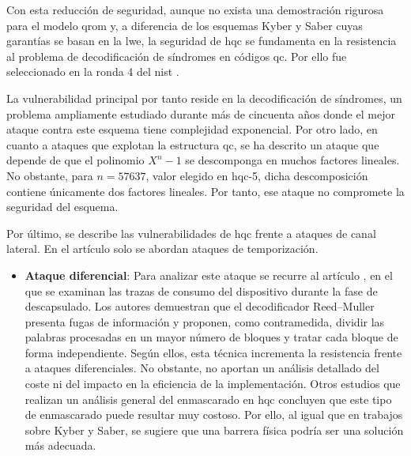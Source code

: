 Con esta reducción de seguridad, aunque no exista una demostración rigurosa para el modelo \acrshort{qrom} y, a diferencia de los esquemas Kyber y Saber cuyas garantías se basan en la \acrshort{lwe}, la seguridad de \acrshort{hqc} se fundamenta en la resistencia al problema de decodificación de síndromes en códigos \acrshort{qc}. Por ello fue seleccionado en la ronda 4 del \acrshort{nist} \cite{nistPQCround4}.
\newline

La vulnerabilidad principal por tanto reside en la decodificación de síndromes, un problema ampliamente estudiado durante más de cincuenta años \cite{hqc2025} donde el mejor ataque contra este esquema \cite{dumer} tiene complejidad exponencial. Por otro lado, en cuanto a ataques que explotan la estructura \acrshort{qc}, se ha descrito un ataque \cite{Sendrier2011} que depende de que el polinomio \(X^n-1\) se descomponga en muchos factores lineales. No obstante, para \(n=57637\), valor elegido en \acrshort{hqc}-5, dicha descomposición contiene únicamente dos factores lineales. Por tanto, ese ataque no compromete la seguridad del esquema.
\newline

Por último, se describe las vulnerabilidades de \acrshort{hqc} frente a ataques de canal lateral. En el artículo \cite{hqc2025} solo se abordan ataques de temporización.
\begin{itemize}
	\item \textbf{Ataque diferencial}: Para analizar este ataque se recurre al artículo \cite{GoyGaborit}, en el que se examinan las trazas de consumo del dispositivo durante la fase de descapsulado. Los autores demuestran que el decodificador Reed–Muller presenta fugas de información y proponen, como contramedida, dividir las palabras procesadas en un mayor número de bloques y tratar cada bloque de forma independiente. Según ellos, esta técnica incrementa la resistencia frente a ataques diferenciales. No obstante, no aportan un análisis detallado del coste ni del impacto en la eficiencia de la implementación. Otros estudios que realizan un análisis general del enmascarado en \acrshort{hqc} \cite{cryptoeprint:2025/1344} concluyen que este tipo de enmascarado puede resultar muy costoso. Por ello, al igual que en trabajos sobre Kyber y Saber, se sugiere que una barrera física podría ser una solución más adecuada.
\end{itemize}
